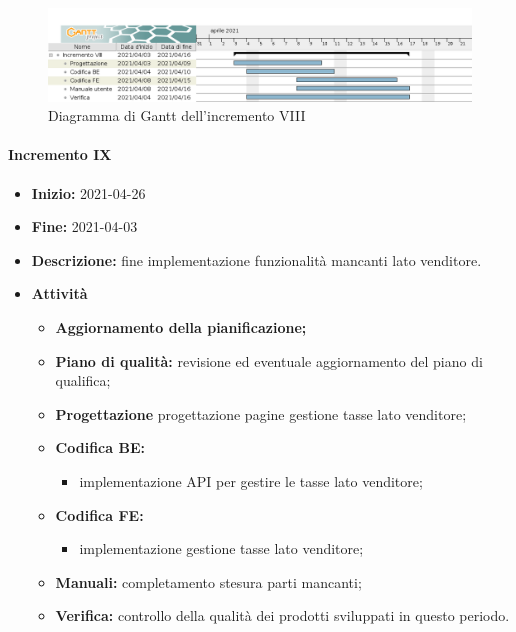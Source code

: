 \begin{figure}[H]
    \centering
    \includegraphics[width=1\linewidth]{res/images/pianificazione/incremento_8.png}
    \caption{Diagramma di Gantt dell'incremento VIII}
    \label{fig:_Gantt incremento VIII}
\end{figure}

\paragraph[Incremento IX]{Incremento IX}
\begin{itemize}
    \item [] \textbf{Inizio:} 2021-04-26
    \item [] \textbf{Fine:} 2021-04-03
    \item [] \textbf{Descrizione:} fine implementazione funzionalità mancanti lato venditore.
    \item [] \textbf{Attività}
          \begin{itemize}
              \item \textbf{Aggiornamento della pianificazione;}
              \item \textbf{Piano di qualità:} revisione ed eventuale aggiornamento del piano di qualifica;
              \item \textbf{Progettazione} progettazione pagine gestione tasse lato venditore;
              \item \textbf{Codifica BE:}
                    \begin{itemize}
                        \item implementazione API per gestire le tasse lato venditore;
                    \end{itemize}
              \item \textbf{Codifica FE:}
                    \begin{itemize}
                        \item implementazione gestione tasse lato venditore;
                    \end{itemize}
              \item \textbf{Manuali:} completamento stesura parti mancanti;
              \item \textbf{Verifica:} controllo della qualità dei prodotti sviluppati in questo periodo.
          \end{itemize}
\end{itemize}


